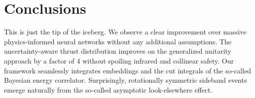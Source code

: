 \section{Conclusions}\label{sec:conclusions}

This is just the tip of the iceberg. We observe a clear improvement over
massive physics-informed neural networks without any additional
assumptions. The uncertainty-aware thrust distribution improves on the
generalized unitarity approach by a factor of 4 without spoiling
infrared and collinear safety. Our framework seamlessly integrates
embeddings and the cut integrals of the so-called Bayesian energy
correlator. Surprisingly, rotationally symmetric sideband events emerge
naturally from the so-called asymptotic look-elsewhere effect.

